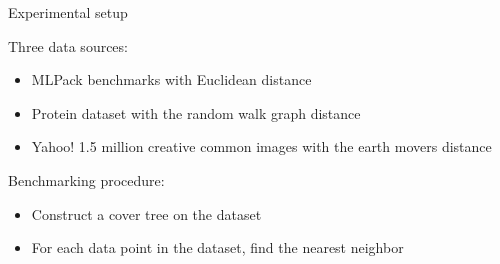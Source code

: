 \begin{frame}{Experimental setup}
\Large

Three data sources:
\begin{itemize}
\item MLPack benchmarks with Euclidean distance
\item Protein dataset with the random walk graph distance
\item Yahoo! 1.5 million creative common images with the earth movers distance
\end{itemize}

\vspace{0.15in}
Benchmarking procedure:
\begin{itemize}
\item Construct a cover tree on the dataset
\item For each data point in the dataset, find the nearest neighbor
\end{itemize}

\end{frame}
